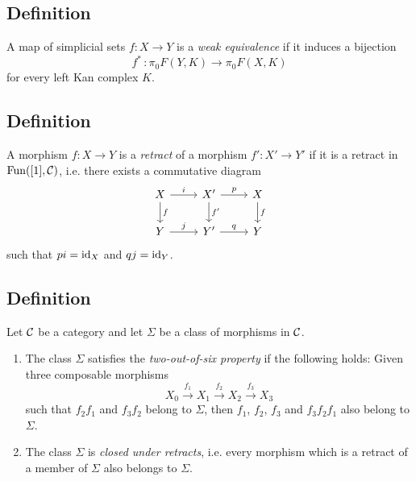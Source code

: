     \subsection{Definition}
        A map of simplicial sets $f \colon X \to Y$ is a \emph{weak equivalence} if it induces a bijection
        \begin{equation*}
            f^{*} \,\colon \pi_0F(Y, K) \to \pi_0F(X,K)
        \end{equation*}
        for every left Kan complex $K$.

    \subsection{Definition}
        A morphism $f \colon X \to Y$ is a  \emph{retract} of a morphism $f' \colon X' \to Y'$ if it is a retract in $\operatorname{Fun}([1],\mathcal{C})$, i.e. there exists a commutative diagram
        \begin{equation*}
            \begin{tikzcd}
                X \arrow[r, "i"] \arrow[d, "f"] & X' \arrow[r, "p"] \arrow[d, "f'"] & X \arrow[d, "f"] \\
                Y \arrow[r, "j"] & Y' \arrow[r, "q"] & Y
            \end{tikzcd}
        \end{equation*}
        such that $pi=\operatorname{id}_X$ and $qj = \operatorname{id}_Y$.

    \subsection{Definition}
        Let $\mathcal{C}$ be a category and let $\Sigma$ be a class of morphisms in $\mathcal{C}$.
        \begin{enumerate}[label=\roman*)]
            \item 
                The class $\Sigma$ satisfies the \emph{two-out-of-six property} if the following holds: Given three composable morphisms
                \begin{equation*}
                    X_0 \xrightarrow{f_1} X_1 \xrightarrow{f_2} X_2 \xrightarrow{f_3} X_3
                \end{equation*}
                such that $f_2f_1$ and $f_3f_2$ belong to $\Sigma$, then $f_1$, $f_2$, $f_3$ and $f_3f_2f_1$ also belong to $\Sigma$.
            \item 
                The class $\Sigma$ is \emph{closed under retracts}, i.e. every morphism which is a retract of a member of $\Sigma$ also belongs to $\Sigma$.
        \end{enumerate}

